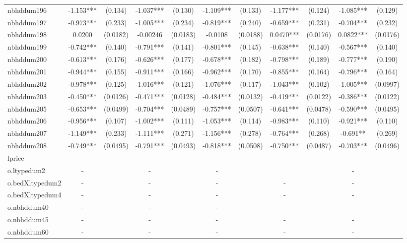 \documentclass[]{article}
\begin{document}
\begin{tabular}{lcccccccccc}
nbhddum196 & -1.153*** & (0.134) & -1.037*** & (0.130) & -1.109*** & (0.133) & -1.177*** & (0.124) & -1.085*** & (0.129) \\
nbhddum197 & -0.973*** & (0.233) & -1.005*** & (0.234) & -0.819*** & (0.240) & -0.659*** & (0.231) & -0.704*** & (0.232) \\
nbhddum198 & 0.0200 & (0.0182) & -0.00246 & (0.0183) & -0.0108 & (0.0188) & 0.0470*** & (0.0176) & 0.0822*** & (0.0176) \\
nbhddum199 & -0.742*** & (0.140) & -0.791*** & (0.141) & -0.801*** & (0.145) & -0.638*** & (0.140) & -0.567*** & (0.140) \\
nbhddum200 & -0.613*** & (0.176) & -0.626*** & (0.177) & -0.678*** & (0.182) & -0.798*** & (0.189) & -0.777*** & (0.190) \\
nbhddum201 & -0.944*** & (0.155) & -0.911*** & (0.166) & -0.962*** & (0.170) & -0.855*** & (0.164) & -0.796*** & (0.164) \\
nbhddum202 & -0.978*** & (0.125) & -1.016*** & (0.121) & -1.076*** & (0.117) & -1.043*** & (0.102) & -1.005*** & (0.0997) \\
nbhddum203 & -0.450*** & (0.0126) & -0.471*** & (0.0128) & -0.484*** & (0.0132) & -0.419*** & (0.0122) & -0.386*** & (0.0122) \\
nbhddum205 & -0.653*** & (0.0499) & -0.704*** & (0.0489) & -0.757*** & (0.0507) & -0.641*** & (0.0478) & -0.590*** & (0.0495) \\
nbhddum206 & -0.956*** & (0.107) & -1.002*** & (0.111) & -1.053*** & (0.114) & -0.983*** & (0.110) & -0.921*** & (0.110) \\
nbhddum207 & -1.149*** & (0.233) & -1.111*** & (0.271) & -1.156*** & (0.278) & -0.764*** & (0.268) & -0.691** & (0.269) \\
nbhddum208 & -0.749*** & (0.0495) & -0.791*** & (0.0493) & -0.818*** & (0.0508) & -0.750*** & (0.0487) & -0.703*** & (0.0496) \\
lprice &  &  &  &  &  &  &  &  &  &  \\
o.ltypedum2 & - &  & - &  & - &  &  &  & - &  \\
o.bedXltypedum2 & - &  & - &  & - &  & - &  & - &  \\
o.bedXltypedum4 & - &  & - &  & - &  & - &  & - &  \\
o.nbhddum40 & - &  & - &  & - &  &  &  &  &  \\
o.nbhddum45 & - &  & - &  & - &  & - &  & - &  \\
o.nbhddum60 & - &  & - &  & - &  & - &  & - &  \\

\end{tabular}
\end{document}
